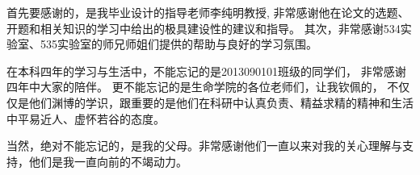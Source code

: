 
首先要感谢的，是我毕业设计的指导老师李纯明教授,
非常感谢他在论文的选题、开题和相关知识的学习中给出的极具建设性的建议和指导。
其次，非常感谢534实验室、535实验室的师兄师姐们提供的帮助与良好的学习氛围。

在本科四年的学习与生活中，不能忘记的是2013090101班级的同学们，
非常感谢四年中大家的陪伴。
更不能忘记的是生命学院的各位老师们，让我钦佩的，
不仅仅是他们渊博的学识，跟重要的是他们在科研中认真负责、精益求精的精神和生活中平易近人、虚怀若谷的态度。

当然，绝对不能忘记的，是我的父母。非常感谢他们一直以来对我的关心理解与支持，他们是我一直向前的不竭动力。

